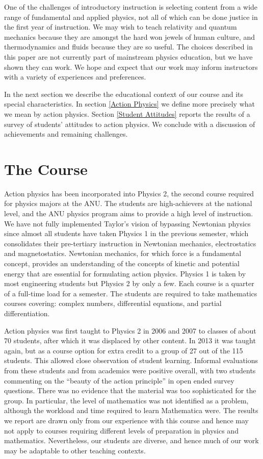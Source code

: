 \documentclass[prb,oncolumn]{revtex4-2}
\begin{document}
One of the challenges of introductory instruction is selecting content from a wide range of fundamental and applied physics, not all of which can be done justice in the first year of instruction. We may wish to teach relativity and quantum mechanics because they are amongst the hard won jewels of human culture, and thermodynamics and fluids because they are so useful. The choices described in this paper are not currently part of mainstream physics education, but we have shown they can work. We hope and expect that our work may inform instructors with a variety of experiences and preferences.

In the next section we describe the educational context of our course and its special characteristics. In section \ref{Action Physics} we define more precisely what we mean by action physics. Section \ref{Student Attitudes} reports the results of a survey of students' attitudes to action physics. We conclude with a discussion of achievements and remaining challenges. 


\section{The Course}
\label{The Course}

Action physics has been incorporated into Physics 2, the second course required for physics majors at the ANU. \cite{phys1201}  The students are high-achievers at the national level, and the ANU physics program aims to provide a high level of instruction. \cite{PECMission} We have not fully implemented Taylor's vision of bypassing Newtonian physics since almost all students have taken Physics 1 in the previous semester, which consolidates their pre-tertiary instruction in Newtonian mechanics, electrostatics and magnetostatics. \cite{phys1101}  Newtonian mechanics, for which force is a fundamental concept, provides an understanding of the concepts of kinetic and potential energy that are essential for formulating action physics. Physics 1 is taken by most engineering students but Physics 2 by only a few. Each course is a quarter of a full-time load for a semester. The students are required to take mathematics courses covering: complex numbers, differential equations, and partial differentiation.

Action physics was first taught to Physics 2 in 2006 and 2007 to classes of about 70 students, after which it was displaced by other content. In 2013 it was taught again, but as a course option for extra credit to a group of 27 out of the 115 students. This allowed close observation of student learning. Informal evaluations from these students and from academics were positive overall, with two students commenting on the ``beauty of the action principle'' in open ended survey questions. There was no evidence that the material was too sophisticated for the group. In particular, the level of mathematics was not identified as a problem, although the workload and time required to learn Mathematica were. The results we report are drawn only from our experience with this course and hence may not apply to courses requiring different levels of preparation in physics and mathematics. Nevertheless, our students are diverse, and hence much of our work may be adaptable to other teaching contexts.
\end{document}
